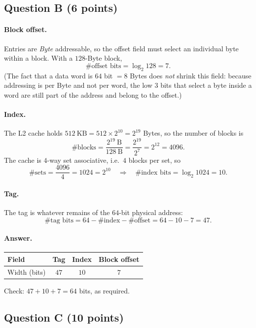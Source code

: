 \subsection*{Question B (6 points)}

\paragraph{Block offset.}
Entries are \emph{Byte} addressable, so the offset field must select an individual byte
within a block. With a $128$-Byte block,
\[
  \#\text{offset bits}=\log_{2}128=7 .
\]
(The fact that a data word is $64$ bit $=8$ Bytes does \emph{not} shrink this field:
because addressing is per Byte and not per word, the low $3$ bits that select a byte
inside a word are still part of the address and belong to the offset.)

\paragraph{Index.}
The L2 cache holds $512\ \mathrm{KB}=512\times2^{10}=2^{19}$ Bytes, so the number of
blocks is
\[
  \#\text{blocks}=\frac{2^{19}\ \mathrm{B}}{128\ \mathrm{B}}=\frac{2^{19}}{2^{7}}=2^{12}=4096 .
\]
The cache is $4$-way set associative, i.e.\ $4$ blocks per set, so
\[
  \#\text{sets}=\frac{4096}{4}=1024=2^{10}
  \quad\Longrightarrow\quad
  \#\text{index bits}=\log_{2}1024=10 .
\]

\paragraph{Tag.}
The tag is whatever remains of the $64$-bit physical address:
\[
  \#\text{tag bits}=64-\#\text{index}-\#\text{offset}=64-10-7=47 .
\]

\paragraph{Answer.}
\begin{center}
\begin{tabular}{lccc}
\toprule
Field & Tag & Index & Block offset \\
\midrule
Width (bits) & $47$ & $10$ & $7$ \\
\bottomrule
\end{tabular}
\end{center}
Check: $47+10+7=64$ bits, as required.

\subsection*{Question C (10 points)}

